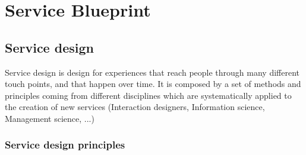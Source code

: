 \documentclass[10pt,a4paper]{article}
\begin{document}
\section{\LARGE Service Blueprint}
\subsection{Service design}
Service design is design for experiences that reach people through many different touch points, and that happen over time. It is composed by a set of methods and principles coming from different disciplines which are systematically applied to the creation of new services (Interaction designers, Information science, Management science, ...)
\subsubsection{Service design principles}
\end{document}
